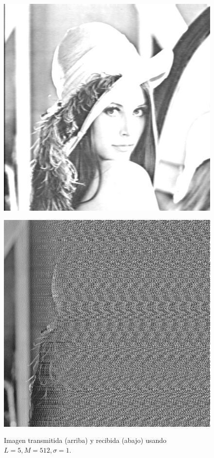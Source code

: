 \documentclass[10pt,journal,compsoc]{IEEEtran}
\begin{document}
\begin{figure}
\begin{center}
\label{fig:refuerzos2}
\centering
\begin{minipage}{.5\textwidth}
  \centering

  \includegraphics[scale=0.25]{../512/5/imgTrans.jpg}
  \label{fig:sub1}
\end{minipage}
\vspace{0cm}
\begin{minipage}{.5\textwidth}
  \centering
  \includegraphics[scale=0.25]{../512/5/imgRec.jpg}
  \label{fig:sub2}
\end{minipage}
\caption{Imagen transmitida (arriba) y recibida (abajo) usando $L=5 , M=512, \sigma=1$.}
\label{fig:test}
\end{center}
\end{figure}
\end{document}
